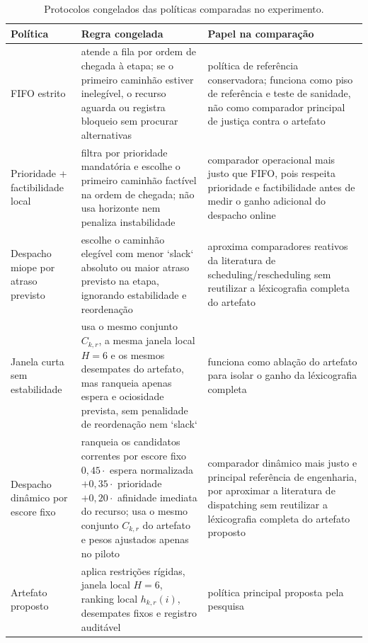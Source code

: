 \documentclass[
  12pt,
  oneside,
  a4paper,
  sumario=tradicional,
  brazil
]{abntex2}
\begin{document}
\begin{table}[H]
\centering
\small
\begin{tabular}{|p{}|p{}|p{}|}
\hline
\textbf{Pol\'itica} & \textbf{Regra congelada} & \textbf{Papel na compara\c{c}\~ao} \\
\hline
FIFO estrito & atende a fila por ordem de chegada \`a etapa; se o primeiro caminh\~ao estiver ineleg\'ivel, o recurso aguarda ou registra bloqueio sem procurar alternativas & pol\'itica de refer\^encia conservadora; funciona como piso de refer\^encia e teste de sanidade, n\~ao como comparador principal de justi\c{c}a contra o artefato \\
\hline
Prioridade + factibilidade local & filtra por prioridade mandat\'oria e escolhe o primeiro caminh\~ao fact\'ivel na ordem de chegada; n\~ao usa horizonte nem penaliza instabilidade & comparador operacional mais justo que FIFO, pois respeita prioridade e factibilidade antes de medir o ganho adicional do despacho online \\
\hline
Despacho miope por atraso previsto & escolhe o caminh\~ao eleg\'ivel com menor `slack` absoluto ou maior atraso previsto na etapa, ignorando estabilidade e reordena\c{c}\~ao & aproxima comparadores reativos da literatura de scheduling/rescheduling sem reutilizar a l\'exicografia completa do artefato \\
\hline
Janela curta sem estabilidade & usa o mesmo conjunto $C_{k,r}$, a mesma janela local $H=6$ e os mesmos desempates do artefato, mas ranqueia apenas espera e ociosidade prevista, sem penalidade de reordena\c{c}\~ao nem `slack` & funciona como abla\c{c}\~ao do artefato para isolar o ganho da l\'exicografia completa \\
\hline
Despacho din\^amico por escore fixo & ranqueia os candidatos correntes por escore fixo $0{,}45 \cdot$ espera normalizada $+ 0{,}35 \cdot$ prioridade $+ 0{,}20 \cdot$ afinidade imediata do recurso; usa o mesmo conjunto $C_{k,r}$ do artefato e pesos ajustados apenas no piloto & comparador din\^amico mais justo e principal refer\^encia de engenharia, por aproximar a literatura de dispatching sem reutilizar a l\'exicografia completa do artefato proposto \\
\hline
Artefato proposto & aplica restri\c{c}\~oes r\'igidas, janela local $H=6$, ranking local $h_{k,r}(i)$, desempates fixos e registro audit\'avel & pol\'itica principal proposta pela pesquisa \\
\hline
\end{tabular}
\caption{Protocolos congelados das pol\'iticas comparadas no experimento.}
\end{table}
\end{document}
